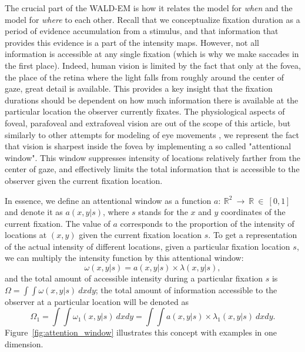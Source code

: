 \documentclass{article}
\begin{document}
The crucial part of the WALD-EM is how it relates the model for \textit{when} and the model for \textit{where} to each other. Recall that we conceptualize fixation duration as a period of evidence accumulation from a stimulus, and that information that provides this evidence is a part of the intensity maps. However, not all information is accessible at any single fixation (which is why we make saccades in the first place).
Indeed, human vision is limited by the fact that only at the fovea, the place of the retina where the light falls from roughly around the center of gaze, great detail is available. This provides a key insight that the fixation durations should be dependent on how much information there is available at the particular location the observer currently fixates. The physiological aspects of foveal, parafoveal and extrafoveal vision are out of the scope of this article, but similarly to other attempts for modeling of eye movements \citep{trukenbrod2014icat, schutt2017likelihood,schwetlick2020scenewalk_extendeds}, we represent the fact that vision is sharpest inside the fovea by implementing a so called "attentional window". This window suppresses intensity of locations relatively farther from the center of gaze, and effectively limits the total information that is accessible to the observer given the current fixation location. 


In essence, we define an attentional window as a function $a:~\mathbb{R}^2~\rightarrow~\mathbb{R}~\in~[0, 1]$ and denote it as $a(x, y | s)$, where $s$ stands for the $x$ and $y$ coordinates of the current fixation. The value of $a$ corresponds to the proportion of the intensity of locations at $(x, y)$ given the current fixation location $s$. To get a representation of the actual intensity of different locations, given a particular fixation location $s$, we can multiply the intensity function by this attentional window: 
\begin{equation}
\omega(x, y | s) = a(x, y | s)\times\lambda(x, y | s),
\end{equation}
and the total amount of accessible intensity during a particular fixation $s$ is $\Omega = \int\int \omega(x, y | s)~dx dy$; the total amount of information accessible to the observer at a particular location will be denoted as
\begin{equation}
\Omega_1 = \int\int \omega_1(x, y | s)~dx dy = \int\int a(x, y | s)\times\lambda_1(x, y | s)~dx dy.
\end{equation}
Figure~\ref{fig:attention_window} illustrates this concept with examples in one dimension.
\end{document}
